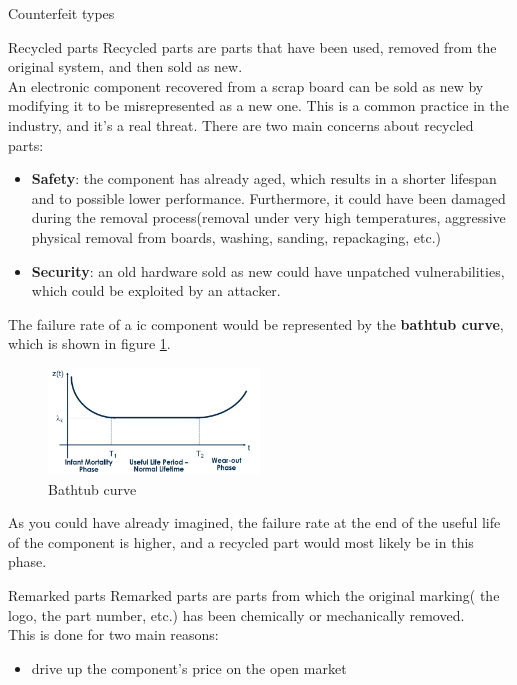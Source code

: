 \begin{section}{Counterfeit types}
  \begin{subsection}{Recycled parts}
    Recycled parts are parts that have been used, removed from the original system, and then sold as
    new.\\
    An electronic component recovered from a scrap board can be sold as new by modifying it to be 
    misrepresented as a new one. This is a common practice in the industry, and it's a real threat.
    There are two main concerns about recycled parts:
    \begin{itemize}
      \item \textbf{Safety}: the component has already aged, which results in a shorter lifespan and
        to possible lower performance. Furthermore, it could have been damaged during the removal
        process(removal under very high temperatures, aggressive physical removal from boards,
        washing, sanding, repackaging, etc.)
      \item \textbf{Security}: an old hardware sold as new could have unpatched vulnerabilities, which
        could be exploited by an attacker.
    \end{itemize}
    The failure rate of a ic component would be represented by the \textbf{bathtub curve}, which
    is shown in figure \ref{fig:bathtub-curve}.
    \begin{figure}[H]
      \centering
      \includegraphics[width=0.5\textwidth]{img/hardware/bathub curve.png}
      \caption{Bathtub curve}
      \label{fig:bathtub-curve}
    \end{figure}
    As you could have already imagined, the failure rate at the end of the useful life of the 
    component is higher, and a recycled part would most likely be in this phase.
  \end{subsection}
  \begin{subsection}{Remarked parts}
    Remarked parts are parts from which the original marking( the logo, the part number, etc.) has
    been chemically or mechanically removed.\\
    This is done for two main reasons:
    \begin{itemize}
      \item drive up the component's price on the open market

\end{itemize}
\end{subsection}
\end{section}

